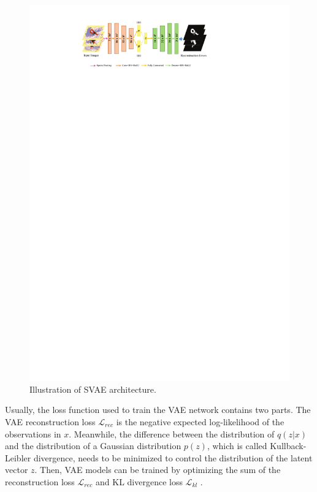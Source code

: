 \documentclass[sigconf]{acmart}
\begin{document}
\begin{figure}[tp]
\centering
\includegraphics[scale=0.9]{Fig3.pdf}
\caption{Illustration of SVAE architecture.}
\label{fig:label}
\end{figure}



Usually, the loss function used to train the VAE network contains two parts. The VAE reconstruction loss $\mathcal{L}_{rec}$ is the negative expected log-likelihood of the observations in $x$. Meanwhile, the difference between the distribution of $q(z|x)$ and the distribution of a Gaussian distribution $p(z)$, which is called Kullback-Leibler divergence, needs to be minimized to control the distribution of the latent vector $z$. Then, VAE models can be trained by optimizing the sum of the reconstruction loss  $\mathcal{L}_{rec}$ and KL divergence loss $\mathcal{L}_{kl}$ . 
\end{document}
